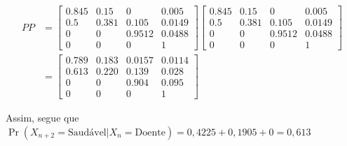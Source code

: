 \documentclass[12pt]{article}
\theoremstyle{break}
\begin{document}



\begin{align*}
PP &= 
\begin{bmatrix*}
0.845 & 0.15  & 0     & 0.005 \\ 
0.5   & 0.381 & 0.105 & 0.0149 \\ 
0     & 0     & 0.9512 & 0.0488 \\ 
0     & 0     & 0     & 1
\end{bmatrix*}
\begin{bmatrix*}
0.845 & 0.15  & 0     & 0.005 \\ 
0.5   & 0.381 & 0.105 & 0.0149 \\ 
0     & 0     & 0.9512 & 0.0488 \\ 
0     & 0     & 0     & 1
\end{bmatrix*} \\[10pt]
&= 
\begin{bmatrix*}
0.789 & 0.183 & 0.0157 & 0.0114 \\ 
0.613 & 0.220 & 0.139  & 0.028  \\ 
0     & 0     & 0.904  & 0.095  \\ 
0     & 0     & 0      & 1
\end{bmatrix*}
\end{align*}








Assim, segue que  $\Pr(X_{n+2} = \text{Saudável} | X_n = \text{Doente}) = 0,4225+0,1905 + 0= 0,613$
\end{document}

